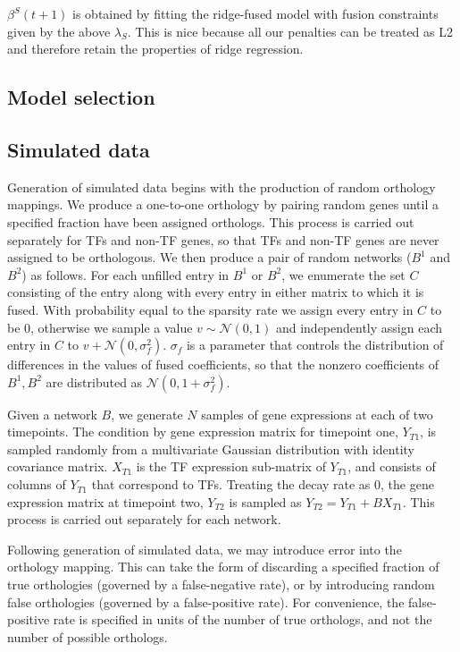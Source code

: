 \documentclass[11pt]{article}
\begin{document}
$\beta^S(t+1)$ is obtained by fitting the ridge-fused model with fusion constraints given by the above $\lambda_S$. This is nice because all our penalties can be treated as L2 and therefore retain the properties of ridge regression. 

\subsection{Model selection}


\subsection{Simulated data}
Generation of simulated data begins with the production of random orthology mappings. We produce a one-to-one orthology by pairing random genes until a specified fraction have been assigned orthologs. This process is carried out separately for TFs and non-TF genes, so that TFs and non-TF genes are never assigned to be orthologous. We then produce a pair of random networks ($B^1$ and $B^2$) as follows. For each unfilled entry in $B^1$ or $B^2$, we enumerate the set $C$ consisting of the entry along with every entry in either matrix to which it is fused. With probability equal to the sparsity rate we assign every entry in $C$ to be 0, otherwise we sample a value $v \sim \mathcal{N}(0,1)$ and independently assign each entry in $C$ to $v + \mathcal{N}(0, \sigma_f^2)$. $\sigma_f$ is a parameter that controls the distribution of differences in the values of fused coefficients, so that the nonzero coefficients of $B^1, B^2$ are distributed as $\mathcal{N}(0, 1 + \sigma_f^2)$.

Given a network $B$, we generate $N$ samples of gene expressions at each of two timepoints. The condition by gene expression matrix for timepoint one, $Y_{T1}$, is sampled randomly from a multivariate Gaussian distribution with identity covariance matrix. $X_{T1}$ is the TF expression sub-matrix of $Y_{T1}$, and consists of columns of $Y_{T1}$ that correspond to TFs. Treating the decay rate as 0, the gene expression matrix at timepoint two, $Y_{T2}$ is sampled as $Y_{T2} = Y_{T1} + BX_{T1}$. This process is carried out separately for each network. 

Following generation of simulated data, we may introduce error into the orthology mapping. This can take the form of discarding a specified fraction of true orthologies (governed by a false-negative rate), or by introducing random false orthologies (governed by a false-positive rate). For convenience, the false-positive rate is specified in units of the number of true orthologs, and not the number of possible orthologs. 
\end{document}
